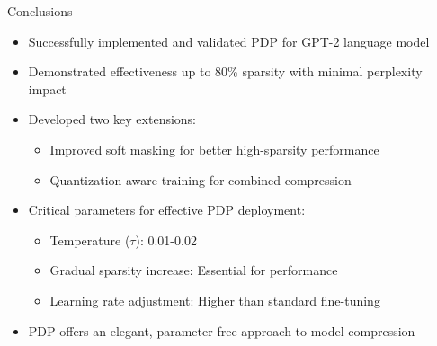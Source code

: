 \documentclass{beamer}
\begin{document}
\begin{frame}{Conclusions}
\begin{itemize}
    \item Successfully implemented and validated PDP for GPT-2 language model
    \item Demonstrated effectiveness up to 80\% sparsity with minimal perplexity impact
    \item Developed two key extensions:
    \begin{itemize}
        \item Improved soft masking for better high-sparsity performance
        \item Quantization-aware training for combined compression
    \end{itemize}
    \item Critical parameters for effective PDP deployment:
    \begin{itemize}
        \item Temperature ($\tau$): 0.01-0.02
        \item Gradual sparsity increase: Essential for performance
        \item Learning rate adjustment: Higher than standard fine-tuning
    \end{itemize}
    \item PDP offers an elegant, parameter-free approach to model compression
\end{itemize}
\end{frame}
\end{document}
